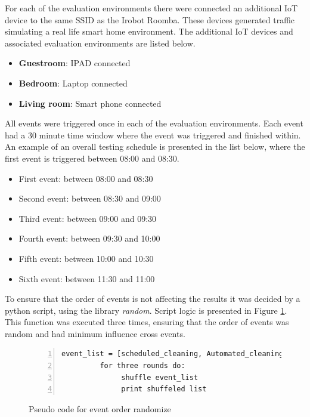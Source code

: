 For each of the evaluation environments there were connected an additional IoT device to the same SSID as the Irobot Roomba. These devices generated traffic simulating a real life smart home environment. The additional IoT devices and associated evaluation environments are listed below.

\begin{itemize}
    \item \textbf{Guestroom}: IPAD connected
    \item \textbf{Bedroom}: Laptop connected
    \item \textbf{Living room}: Smart phone connected
\end{itemize}

All events were triggered once in each of the evaluation environments. Each event had a 30 minute time window where the event was triggered and finished within. An example of an overall testing schedule is presented in the list below, where the first event is triggered between 08:00 and 08:30. 

\begin{itemize}
    \item First event: between 08:00 and 08:30
    \item Second event: between 08:30 and 09:00
    \item Third event: between 09:00 and 09:30
    \item Fourth event: between 09:30 and 10:00
    \item Fifth event: between 10:00 and 10:30
    \item Sixth event: between 11:30 and 11:00
\end{itemize}

To ensure that the order of events is not affecting the results it was decided by a python script, using the library \textit{random}. Script logic is presented in Figure \ref{fig:Sudo_code_for_event_order_randomize}. This function was executed three times, ensuring that the order of events was random and had minimum influence cross events.

\begin{figure}[H]
    \centering
    \caption{Pseudo code for event order randomize}
    \label{fig:Sudo_code_for_event_order_randomize}
    \begin{lstlisting}[numbers=left]
         event_list = [scheduled_cleaning, Automated_cleaning, Application_triggered_cleaning, Application_start, Physical_triggered_cleaning, Bin_remove]
         for three rounds do:
              shuffle event_list
              print shuffeled list
    \end{lstlisting}
\end{figure}

